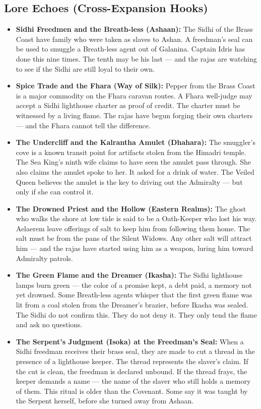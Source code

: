 \subsection*{Lore Echoes (Cross-Expansion Hooks)}
\begin{itemize}
  \item \textbf{Sidhi Freedmen and the Breath-less (Ashaan):} The Sidhi of the Brass Coast have family who were taken as slaves to Ashan. A freedman's seal can be used to smuggle a Breath-less agent out of Galanina. Captain Idris has done this nine times. The tenth may be his last --- and the rajas are watching to see if the Sidhi are still loyal to their own.
  \item \textbf{Spice Trade and the Fhara (Way of Silk):} Pepper from the Brass Coast is a major commodity on the Fhara caravan routes. A Fhara well-judge may accept a Sidhi lighthouse charter as proof of credit. The charter must be witnessed by a living flame. The rajas have begun forging their own charters --- and the Fhara cannot tell the difference.
  \item \textbf{The Undercliff and the Kalrantha Amulet (Dhahara):} The smuggler's cove is a known transit point for artifacts stolen from the Himadri temple. The Sea King's ninth wife claims to have seen the amulet pass through. She also claims the amulet spoke to her. It asked for a drink of water. The Veiled Queen believes the amulet is the key to driving out the Admiralty --- but only if she can control it.
  \item \textbf{The Drowned Priest and the Hollow (Eastern Realms):} The ghost who walks the shore at low tide is said to be a Oath-Keeper who lost his way. Aelaerem leave offerings of salt to keep him from following them home. The salt must be from the pans of the Silent Widows. Any other salt will attract him --- and the rajas have started using him as a weapon, luring him toward Admiralty patrols.
  \item \textbf{The Green Flame and the Dreamer (Ikasha):} The Sidhi lighthouse lamps burn green --- the color of a promise kept, a debt paid, a memory not yet drowned. Some Breath-less agents whisper that the first green flame was lit from a coal stolen from the Dreamer's brazier, before Ikasha was sealed. The Sidhi do not confirm this. They do not deny it. They only tend the flame and ask no questions.
  \item \textbf{The Serpent's Judgment (Isoka) at the Freedman's Seal:} When a Sidhi freedman receives their brass seal, they are made to cut a thread in the presence of a lighthouse keeper. The thread represents the slaver's claim. If the cut is clean, the freedman is declared unbound. If the thread frays, the keeper demands a name --- the name of the slaver who still holds a memory of them. This ritual is older than the Covenant. Some say it was taught by the Serpent herself, before she turned away from Ashaan.

\end{itemize}
